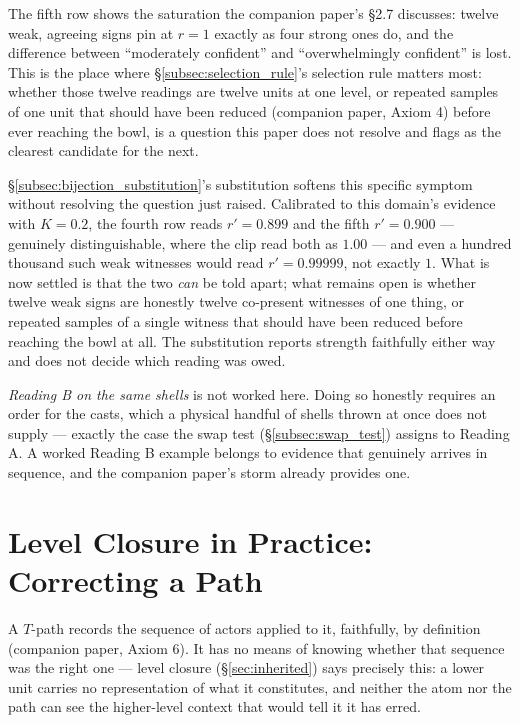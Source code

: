 \documentclass[12pt, a4paper]{article}
\begin{document}
The fifth row shows the saturation the companion paper's \S2.7
discusses: twelve weak, agreeing signs pin at $r=1$ exactly as four
strong ones do, and the difference between ``moderately confident''
and ``overwhelmingly confident'' is lost. This is the place where
\S\ref{subsec:selection_rule}'s selection rule matters most: whether
those twelve readings are twelve units at one level, or repeated
samples of one unit that should have been reduced (companion paper,
Axiom 4) before ever reaching the bowl, is a question this paper does
not resolve and flags as the clearest candidate for the next.

\S\ref{subsec:bijection_substitution}'s substitution softens this
specific symptom without resolving the question just raised.
Calibrated to this domain's evidence with $K=0.2$, the fourth row
reads $r'=0.899$ and the fifth $r'=0.900$ --- genuinely
distinguishable, where the clip read both as $1.00$ --- and even a
hundred thousand such weak witnesses would read $r'=0.99999$, not
exactly $1$. What is now settled is that the two \emph{can} be told
apart; what remains open is whether twelve weak signs are honestly
twelve co-present witnesses of one thing, or repeated samples of a
single witness that should have been reduced before reaching the bowl
at all. The substitution reports strength faithfully either way and
does not decide which reading was owed.

\emph{Reading B on the same shells} is not worked here. Doing so
honestly requires an order for the casts, which a physical handful of
shells thrown at once does not supply --- exactly the case the swap
test (\S\ref{subsec:swap_test}) assigns to Reading A. A worked Reading
B example belongs to evidence that genuinely arrives in sequence, and
the companion paper's storm already provides one.

\section{Level Closure in Practice: Correcting a Path}
\label{sec:level_closure_practice}

A $T$-path records the sequence of actors applied to it, faithfully,
by definition (companion paper, Axiom 6). It has no means of knowing
whether that sequence was the right one --- level closure
(\S\ref{sec:inherited}) says precisely this: a lower unit carries no
representation of what it constitutes, and neither the atom nor the
path can see the higher-level context that would tell it it has erred.
\end{document}
